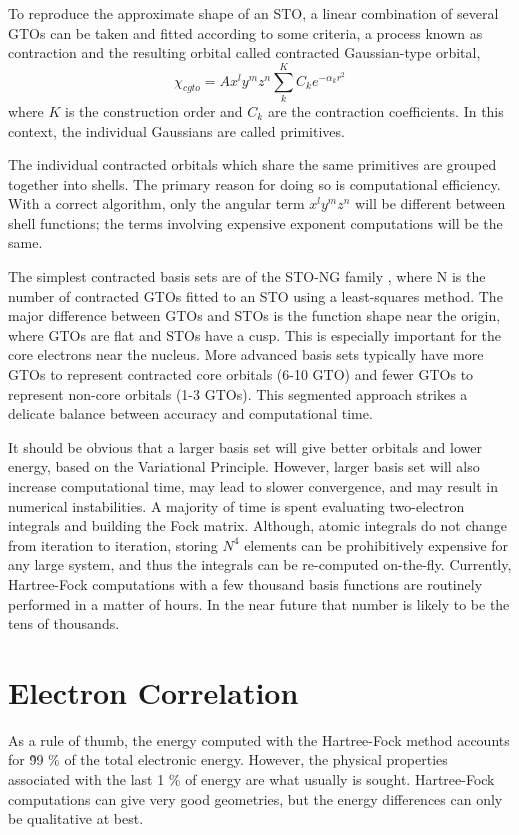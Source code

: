 \documentclass[12pt]{book} \usepackage[margin=1in]{geometry}
\begin{document}
To reproduce the approximate shape of an STO, a linear
combination of several GTOs can be taken and fitted according to
some criteria, a process known as contraction and the resulting
orbital called contracted Gaussian-type orbital,
$$\chi_{cgto} = A x^l y^m z^n \sum_k^K C_k e^{-\alpha_k r^2}$$
where $K$ is the construction order and $C_k$ are the contraction
coefficients.  In this context, the individual Gaussians are called
primitives.


The individual contracted orbitals which share the same primitives are
grouped together into shells.  The primary reason for doing so is
computational efficiency.  With a correct algorithm, only the angular
term $x^l y^m z^n$ will be different between shell functions; the
terms involving expensive exponent computations will be the same.

The simplest contracted basis sets are of the STO-NG family
\cite{pople1970molecular}, where N is the number of contracted GTOs
fitted to an STO using a least-squares method.  The major difference
between GTOs and STOs is the function shape near the origin, where GTOs
are flat and STOs have a cusp.  This is especially important for the
core electrons near the nucleus.  More advanced basis sets typically
have more GTOs to represent contracted core orbitals (6-10 GTO) and
fewer GTOs to represent non-core orbitals (1-3 GTOs).  This segmented
approach strikes a delicate balance between accuracy and computational
time.

It should be obvious that a larger basis set will give better orbitals
and lower energy, based on the Variational Principle.  However, larger
basis set will also increase computational time, may lead to slower
convergence, and may result in numerical instabilities.  A majority of
time is spent evaluating two-electron integrals and building the Fock
matrix.  Although, atomic integrals do not change from iteration to
iteration, storing $N^4$ elements can be prohibitively expensive for any
large system, and thus the integrals can be re-computed on-the-fly.
Currently, Hartree-Fock computations with a few thousand basis
functions are routinely performed in a matter of hours.  In the near
future that number is likely to be the tens of thousands.

\section {Electron Correlation}
As a rule of thumb, the energy computed with the Hartree-Fock method
accounts for \~99 \% of the total electronic energy. However, the physical
properties associated with the last 1 \% of energy are what usually is
sought.  Hartree-Fock computations can give very good geometries, but
the energy differences can only be qualitative at best.
\end{document}
